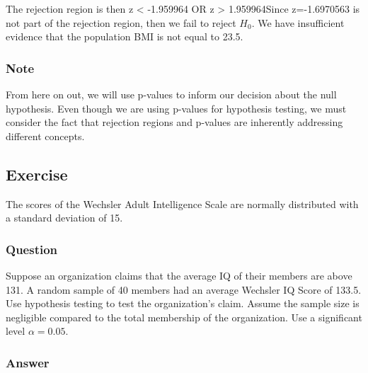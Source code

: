 \documentclass[
  letterpaper,
  DIV=11,
  numbers=noendperiod]{scrartcl}
\begin{document}
The rejection region is then z \textless{} -1.959964 OR z \textgreater{}
1.959964Since z=-1.6970563 is not part of the rejection region, then we
fail to reject \(H_0\). We have insufficient evidence that the
population BMI is not equal to 23.5.

\subsubsection{Note}

\begin{tcolorbox}[enhanced jigsaw, bottomtitle=1mm, colback=white, opacityback=0, leftrule=.75mm, opacitybacktitle=0.6, coltitle=black, left=2mm, colframe=quarto-callout-note-color-frame, toptitle=1mm, colbacktitle=quarto-callout-note-color!10!white, titlerule=0mm, title=\textcolor{quarto-callout-note-color}{\faInfo}\hspace{0.5em}{Note}, arc=.35mm, rightrule=.15mm, breakable, bottomrule=.15mm, toprule=.15mm]

From here on out, we will use p-values to inform our decision about the
null hypothesis. Even though we are using p-values for hypothesis
testing, we must consider the fact that rejection regions and p-values
are inherently addressing different concepts.

\end{tcolorbox}

\subsection{Exercise}\label{exercise-1}

The scores of the Wechsler Adult Intelligence Scale are normally
distributed with a standard deviation of 15.

\subsubsection{Question}

Suppose an organization claims that the average IQ of their members are
above 131. A random sample of 40 members had an average Wechsler IQ
Score of 133.5. Use hypothesis testing to test the organization's claim.
Assume the sample size is negligible compared to the total membership of
the organization. Use a significant level \(\alpha = 0.05\).

\subsubsection{Answer}
\end{document}
